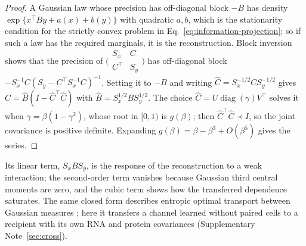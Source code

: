 \begin{proof}
A Gaussian law whose precision has off-diagonal block $-B$ has density
$\exp\{x^\top By+a(x)+b(y)\}$ with quadratic $a,b$, which is the stationarity
condition for the strictly convex problem in
Eq.~\eqref{eq:information-projection}; so if such a law has the required
marginals, it is the reconstruction. Block inversion shows that the precision
of $\bigl(\begin{smallmatrix}S_x&C\\C^\top&S_y\end{smallmatrix}\bigr)$ has
off-diagonal block $-S_x^{-1}C(S_y-C^\top S_x^{-1}C)^{-1}$. Setting it to $-B$
and writing $\hat C=S_x^{-1/2}CS_y^{-1/2}$ gives
$\hat C=\hat B(I-\hat C^\top\hat C)$ with $\hat B=S_x^{1/2}BS_y^{1/2}$. The
choice $\hat C=U\operatorname{diag}(\gamma)V^\top$ solves it when
$\gamma=\beta(1-\gamma^2)$, whose root in $[0,1)$ is $g(\beta)$; then
$\hat C^\top\hat C\prec I$, so the joint covariance is positive definite.
Expanding $g(\beta)=\beta-\beta^3+O(\beta^5)$ gives the series.
\end{proof}

Its linear term, $S_xBS_y$, is the response of the reconstruction to a weak interaction; the second-order term vanishes because Gaussian third central moments are zero, and the cubic term shows how the transferred dependence saturates. The same
closed form describes entropic optimal transport between Gaussian measures
\cite{janati2020,mallasto2022}; here it transfers a channel learned without paired cells to a recipient with its own RNA and protein covariances (Supplementary Note~\ref{sec:cross}).
